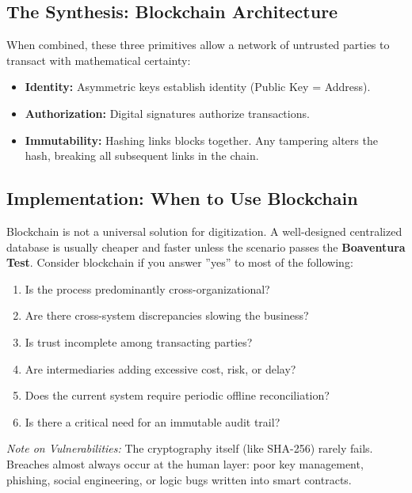 \subsection{The Synthesis: Blockchain Architecture}
When combined, these three primitives allow a network of untrusted parties to
transact with mathematical certainty:
\begin{itemize}
    \item \textbf{Identity:} Asymmetric keys establish identity (Public Key = Address).
    \item \textbf{Authorization:} Digital signatures authorize transactions.
    \item \textbf{Immutability:} Hashing links blocks together. Any tampering alters the hash,
          breaking all subsequent links in the chain.
\end{itemize}

\subsection{Implementation: When to Use Blockchain}
Blockchain is not a universal solution for digitization. A well-designed
centralized database is usually cheaper and faster unless the scenario passes
the \textbf{Boaventura Test}. Consider blockchain if you answer ''yes'' to most of the
following:
\begin{enumerate}
    \item Is the process predominantly cross-organizational?
    \item Are there cross-system discrepancies slowing the business?
    \item Is trust incomplete among transacting parties?
    \item Are intermediaries adding excessive cost, risk, or delay?
    \item Does the current system require periodic offline reconciliation?
    \item Is there a critical need for an immutable audit trail?
\end{enumerate}
\textit{Note on Vulnerabilities:} The cryptography itself (like SHA-256) rarely fails.
Breaches almost always occur at the human layer: poor key management, phishing,
social engineering, or logic bugs written into smart contracts.